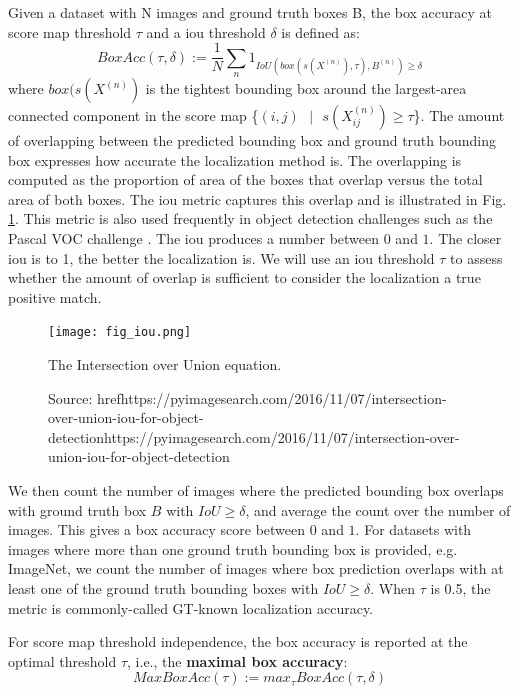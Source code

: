 Given a dataset with N images and ground truth boxes B, the box accuracy at score map threshold $\tau$ and a \acrshort{iou} threshold $\delta$ is defined as:
\begin{equation} \label{eq:boxacc}
    BoxAcc(\tau,\delta) := \frac{1}{N} \sum_{n}1_{IoU(box(s(X^{(n)}),\tau),B^{(n)})\ge\delta}
\end{equation}
where $box(s(X^{(n)})$ is the tightest bounding box around the largest-area connected component in the score map \{$(i,j)\text{ }|\text{ }s(X^{(n)}_{ij}) \ge \tau$\}. The amount of overlapping between the predicted bounding box and ground truth bounding box expresses how accurate the localization method is. The overlapping is computed as the proportion of area of the boxes that overlap versus the total area of both boxes. The \acrfull{iou} metric captures this overlap and is illustrated in Fig. \ref{fig:iou}. This metric is also used frequently in object detection challenges such as the Pascal VOC challenge \cite{everingham2009pascal}. The \acrshort{iou} produces a number between $0$ and $1$. The closer \acrshort{iou} is to 1, the better the localization is. We will use an \acrshort{iou} threshold $\tau$ to assess whether the amount of overlap is sufficient to consider the localization a true positive match.
\begin{figure}[ht]
    \begin{center}       
    \texttt{[image: fig\_iou.png]}
    \caption[The IoU equation]{The Intersection over Union equation.}
    \caption*{Source: href{https://pyimagesearch.com/2016/11/07/intersection-over-union-iou-for-object-detection}{https://pyimagesearch.com/2016/11/07/intersection-over-union-iou-for-object-detection}}
    \label{fig:iou}
    \end{center}
\end{figure}

We then count the number of images where the predicted bounding box overlaps with ground truth box $B$ with $IoU \ge \delta$, and average the count over the number of images. This gives a box accuracy score between $0$ and $1$. For datasets with images where more than one ground truth bounding box is provided, e.g. ImageNet, we count the number of images where box prediction overlaps with at least one of the ground truth bounding boxes with $IoU \ge \delta$. When $\tau$ is 0.5, the metric is commonly-called GT-known localization accuracy. 

For score map threshold independence, the box accuracy is reported at the optimal threshold $\tau$, i.e., the \textbf{maximal box accuracy}:
\begin{equation}
    MaxBoxAcc(\tau) := max_{\tau} BoxAcc(\tau,\delta)
\end{equation}

